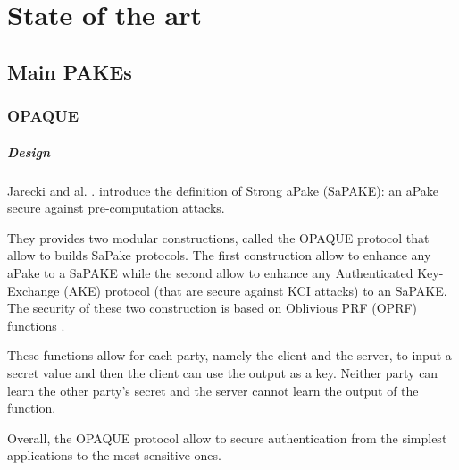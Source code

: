 \documentclass[../report.tex]{subfiles}
\begin{document}





\chapter{State of the art}
\section{Main PAKEs}

\subsection{OPAQUE}


\paragraph{Design}
Jarecki and al. \cite{}. introduce the definition of Strong aPake (SaPAKE): an aPake secure against pre-computation attacks.

They provides two modular constructions, called the OPAQUE protocol that allow to builds SaPake protocols. The first construction allow to enhance any aPake to a SaPAKE while the second allow to enhance any Authenticated Key-Exchange (AKE) protocol (that are secure against KCI attacks) to an SaPAKE.
The security of these two construction is based on Oblivious PRF (OPRF) functions \cite{}.

These functions allow for each party, namely the client and the server, to input a secret value and then the client can use the output as a key. Neither party can learn the other party's secret and the server cannot learn the output of the function.

Overall, the OPAQUE protocol allow to secure authentication from the simplest applications to the most sensitive ones.
\end{document}
